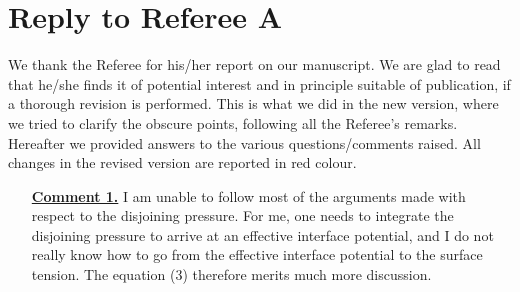 \documentclass[12pt,english]{article}
\begin{document}

\section*{Reply to Referee A}
We thank the Referee for his/her report on our manuscript. 
We are glad to read that he/she finds it of potential interest and in principle 
suitable of publication, if a thorough revision is performed. 
This is what we did in the new version, where we tried to clarify the obscure points, following all the Referee's remarks.
Hereafter we provided answers to the various questions/comments raised. All changes in the revised 
version are reported in red colour.

\begin{itemize}

\item[ \textbf{\underline{Comment 1.}}]
{ 
I am unable to follow most of the arguments made with respect to the disjoining pressure. 
For me, one needs to integrate the disjoining pressure to arrive at an effective interface potential, and 
I do not really know how to go from the effective interface potential to the surface tension. 
The equation (3) therefore merits much more discussion.
}


\end{itemize}
\end{document}
